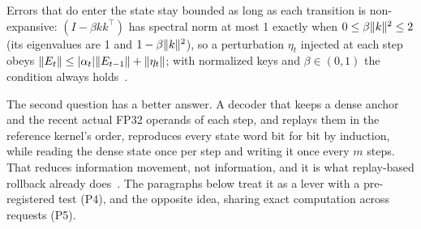 Errors that do enter the state stay bounded as long as each transition is non-expansive: $(I-\beta kk^\top)$ has spectral norm at most 1 exactly when $0\le\beta\lVert k\rVert^2\le2$ (its eigenvalues are 1 and $1-\beta\lVert k\rVert^2$), so a perturbation $\eta_t$ injected at each step obeys $\lVert E_t\rVert\le|\alpha_t|\lVert E_{t-1}\rVert+\lVert \eta_t\rVert$; with normalized keys and $\beta\in(0,1)$ the condition always holds~.

The second question has a better answer. A decoder that keeps a dense anchor and the recent actual FP32 operands of each step, and replays them in the reference kernel's order, reproduces every state word bit for bit by induction, while reading the dense state once per step and writing it once every $m$ steps. That reduces information movement, not information, and it is what replay-based rollback already does~\cite{replayssm,gdncode}. The paragraphs below treat it as a lever with a pre-registered test (P4), and the opposite idea, sharing exact computation across requests (P5).

